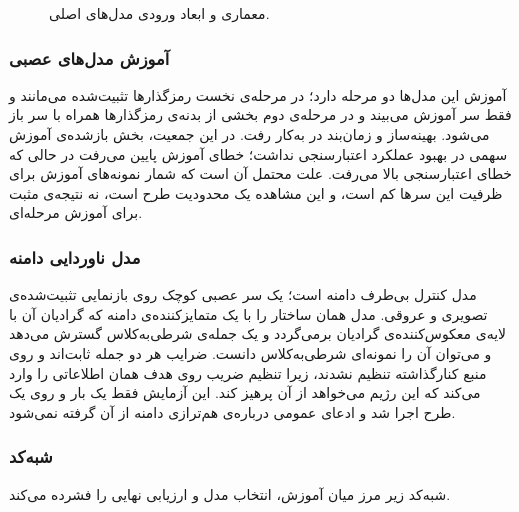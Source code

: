 \begin{figure}[htbp]
  \centering
  \caption{معماری و ابعاد ورودی مدل‌های اصلی.}
  \label{fig:U5}
\end{figure}


\subsubsection{آموزش مدل‌های عصبی}

آموزش این مدل‌ها دو مرحله دارد؛ در مرحله‌ی نخست رمزگذارها تثبیت‌شده می‌مانند و فقط سر آموزش می‌بیند و در مرحله‌ی دوم بخشی از بدنه‌ی رمزگذارها همراه با سر باز می‌شود. بهینه‌ساز  و زمان‌بند  در  به‌کار رفت. در این جمعیت، بخش بازشده‌ی آموزش سهمی در بهبود عملکرد اعتبارسنجی نداشت؛ خطای آموزش پایین می‌رفت در حالی که خطای اعتبارسنجی بالا می‌رفت. علت محتمل آن است که شمار نمونه‌های آموزش برای ظرفیت این سرها کم است، و این مشاهده یک محدودیت طرح است، نه نتیجه‌ی مثبت برای آموزش مرحله‌ای.

\subsubsection{مدل ناوردایی دامنه}

مدل  کنترل بی‌طرف دامنه است؛ یک سر عصبی کوچک روی بازنمایی تثبیت‌شده‌ی تصویری و عروقی. مدل  همان ساختار را با یک متمایزکننده‌ی دامنه که گرادیان آن با لایه‌ی معکوس‌کننده‌ی گرادیان برمی‌گردد و یک جمله‌ی  شرطی‌به‌کلاس گسترش می‌دهد و می‌توان آن را نمونه‌ای  شرطی‌به‌کلاس دانست. ضرایب هر دو جمله ثابت‌اند و روی منبع کنارگذاشته تنظیم نشدند، زیرا تنظیم ضریب روی هدف همان اطلاعاتی را وارد می‌کند که این رژیم می‌خواهد از آن پرهیز کند. این آزمایش فقط یک بار و روی یک طرح اجرا شد و ادعای عمومی درباره‌ی هم‌ترازی دامنه از آن گرفته نمی‌شود.

\subsubsection{شبه‌کد}

شبه‌کد زیر مرز میان آموزش، انتخاب مدل و ارزیابی نهایی را فشرده می‌کند.

